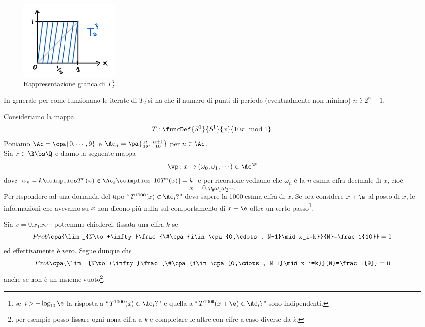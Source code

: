 \begin{example}
\begin{figure}[!htb]
    \centering
    \includegraphics[width=5cm]{Immagini/Bernoulli_iterata.png}
    \caption{Rappresentazione grafica di $T^3_2$.}
\end{figure}

\noindent
In generale per come funzionano le iterate di $T_2$ si ha che il numero di punti di periodo (eventualmente non minimo) $n$ \`e $2^n-1$.
\end{example}

\begin{example}
Consideriamo la mappa
\[T:\funcDef{S^1}{S^1}{x}{10x \mod 1}.\]
Poniamo $\Ac=\cpa{0,\cdots,9}$ e $\Ac_n=\pa{\frac n{10},\frac{n+1}{10}}$ per $n\in\Ac$.\\
Sia $x\in \R\bs \Q$ e diamo la seguente mappa
\[\vp:x\mapsto(\omega_0,\omega_1,\cdots)\in \Ac^{\N}\]
dove $\omega_n=k\coimplies T^n(x)\in \Ac_k\coimplies \lfloor10 T^n(x)\rfloor=k$ e per ricorsione vediamo che $\omega_n$ \`e la $n$-esima cifra decimale di $x$, cio\`e
\[x=0.\omega_0\omega_1\omega_2\cdots.\]
Per rispondere ad una domanda del tipo ``$T^{1000}(x)\in \Ac_i?$" devo sapere la 1000-esima cifra di $x$. Se ora considero $x+\e$ al posto di $x$, le informazioni che avevamo su $x$ non dicono pi\`u nulla sul comportamento di $x+\e$ oltre un certo passo\footnote{se $i>-\log_{10} \e$ la risposta a ``$T^{1000}(x)\in \Ac_i?$" e quella a ``$T^{1000}(x+\e)\in \Ac_i?$" sono indipendenti.}.
\end{example}
    
\begin{remark}
Sia $x=0.x_1x_2\cdots$ potremmo chiederci, fissata una cifra $k$ se
\[Prob\cpa{\lim_{N\to+\infty}\frac{\#\cpa{i\in \cpa{0,\cdots, N-1}\mid x_i=k}}{N}=\frac1{10}}=1\]
ed effettivamente \`e vero. Segue dunque che
\[Prob\cpa{\lim_{N\to+\infty}\frac{\#\cpa{i\in \cpa{0,\cdots, N-1}\mid x_i=k}}{N}=\frac1{9}}=0\]
anche se non \`e un insieme vuoto\footnote{per esempio posso fissare ogni nona cifra a $k$ e completare le altre con cifre a caso diverse da $k$.}.
\end{remark}

